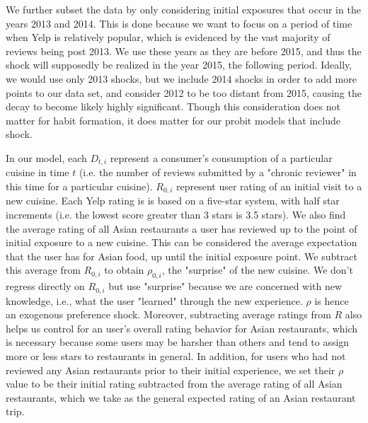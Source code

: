 \documentclass[Journal,letterpaper, NoLineNumbers]{ascelike-new}
\begin{document}
We further subset the data by only considering initial exposures that occur in the years 2013 and 2014. This is done because we want to focus on a period of time when Yelp is relatively popular, which is evidenced by the vast majority of reviews being post 2013. We use these years as they are before 2015, and thus the shock will supposedly be realized in the year 2015, the following period. Ideally, we would use only 2013 shocks, but we include 2014 shocks in order to add more points to our data set, and consider 2012 to be too distant from 2015, causing the decay to become likely highly significant. Though this consideration does not matter for habit formation, it does matter for our probit models that include shock.

In our model, each $D_{t,i}$ represent a consumer's consumption of a particular cuisine in time $t$ (i.e. the number of reviews submitted by a "chronic reviewer" in this time for a particular cuisine). $R_{0,i}$ represent user rating of an initial visit to a new cuisine. Each Yelp rating is is based on a five-star system, with half star increments (i.e. the lowest score greater than 3 stars is 3.5 stars). We also find the average rating of all Asian restaurants a user has reviewed up to the point of initial exposure to a new cuisine. This can be considered the average expectation that the user has for Asian food, up until the initial exposure point. We subtract this average from $R_{0,i}$ to obtain $\rho_{0,i}$, the "surprise" of the new cuisine. We don't regress directly on $R_{0,i}$ but use "surprise" because we are concerned with new knowledge, i.e., what the user "learned" through the new experience. $\rho$ is hence an exogenous preference shock. Moreover, subtracting average ratings from $R$ also helps us control for an user's overall rating behavior for Asian restaurants, which is necessary because some users may be harsher than others and tend to assign more or less stars to restaurants in general. In addition, for users who had not reviewed any Asian restaurants prior to their initial experience, we set their $\rho$ value to be their initial rating subtracted from the average rating of all Asian restaurants, which we take as the general expected rating of an Asian restaurant trip.
\end{document}

